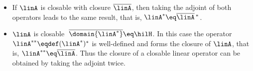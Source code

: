 \documentclass[11pt,twoside]{article}
\begin{document}
\begin{theorem1}
\begin{itemize}[leftmargin=25pt]
\item[(e)]
If $\linA$ is closable with closure $\overline{\linA}$,
then taking the adjoint of both operators leads to the same result,
that is,
$\linA^* \eq \overline{\linA}\,^*$.

\item[(f)]
$\linA$ is closable
\iff
$\; \overline{\domain{\linA^*}} \eq \hilH$.
In this case the operator $\linA^{**} \eqdef (\linA^*)^*$
is well-defined and forms the closure of $\linA$,
that is,
$\linA^{**} \eq \overline{\linA}$.
Thus the closure of a closable linear operator can be obtained
by taking the adjoint twice.

\end{itemize}
\end{theorem1}
\end{document}
